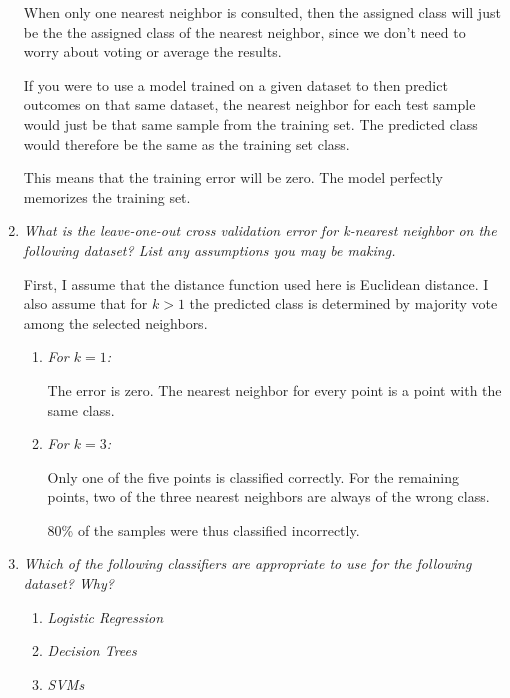 \documentclass[11pt]{article}
\begin{document}
\begin{enumerate}
        When only one nearest neighbor is consulted, then the assigned class
        will just be the the assigned class of the nearest neighbor, since we
        don't need to worry about voting or average the results.

        If you were to use a model trained on a given dataset to then predict
        outcomes on that same dataset, the nearest neighbor for each test
        sample would just be that same sample from the training set. The
        predicted class would therefore be the same as the training set class.

        This means that the training error will be zero. The model perfectly
        memorizes the training set.

    \item \textit{What is the leave-one-out cross validation error for
        k-nearest neighbor on the following dataset? List any assumptions you
        may be making.}

        First, I assume that the distance function used here is Euclidean
        distance. I also assume that for $k > 1$ the predicted class is
        determined by majority vote among the selected neighbors.

        \begin{enumerate}
            \item \textit{For $k = 1$:}

                The error is zero. The nearest neighbor for every point is a
                point with the same class.

            \item \textit{For $k = 3$:}

                Only one of the five points is classified correctly. For the
                remaining points, two of the three nearest neighbors are always
                of the wrong class.

                80\% of the samples were thus classified incorrectly.
        \end{enumerate}

    \item \textit{Which of the following classifiers are appropriate to use for
        the following dataset? Why?}

        \begin{enumerate}
            \item \textit{Logistic Regression}
            \item \textit{Decision Trees}
            \item \textit{SVMs}
        \end{enumerate}


\end{enumerate}
\end{document}

